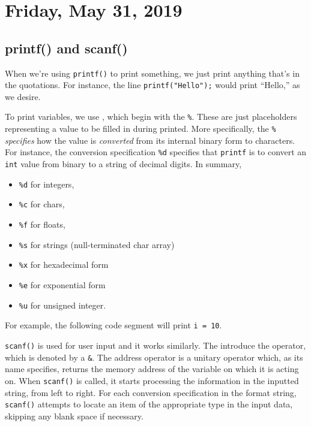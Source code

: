 \section{Friday, May 31, 2019}

\subsection{printf() and scanf()}

When we're using \verb!printf()! to print something, we just print anything that's in the quotations. For instance, the line \verb!printf("Hello");! would print ``Hello,'' as we desire. 


To print variables, we use , which begin with the \verb!%!. These are just placeholders representing a value to be filled in during printed. More specifically, the \verb!%! \textit{specifies} how the value is \textit{converted} from its internal binary form to characters. For instance, the conversion specification \verb!%d! specifies that \verb!printf! is to convert an \verb!int! value from binary to a string of decimal digits. In summary,
\begin{itemize}
    \item \verb!%d! for integers,
    \item \verb!%c! for chars,
    \item \verb!%f! for floats,
    \item \verb!%s! for strings (null-terminated char array)
    \item \verb!%x! for hexadecimal form
    \item \verb!%e! for exponential form
    \item \verb!%u! for unsigned integer.
\end{itemize}

For example, the following code segment will print \verb!i = 10!. 

\lstset{
caption=Printing a Variable
}
\begin{center}

\end{center}



\verb!scanf()! is used for user input and it works similarly. The  introduce the  operator, which is denoted by a \verb!&!. The address operator is a unitary operator which, as its name specifies, returns the memory address of the variable on which it is acting on. When \verb!scanf()! is called, it starts processing the information in the inputted string, from left to right. For each conversion specification in the format string, \verb!scanf()! attempts to locate an item of the appropriate type in the input data, skipping any blank space if necessary. \\


